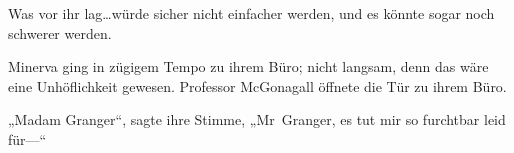 Was vor ihr lag…würde sicher nicht einfacher werden, und es könnte sogar noch schwerer werden.

\later


Minerva ging in zügigem Tempo zu ihrem Büro; nicht langsam, denn das wäre eine Unhöflichkeit gewesen. Professor McGonagall öffnete die Tür zu ihrem Büro.

„Madam Granger“, sagte ihre Stimme, „Mr~Granger, es tut mir so furchtbar leid für—“

